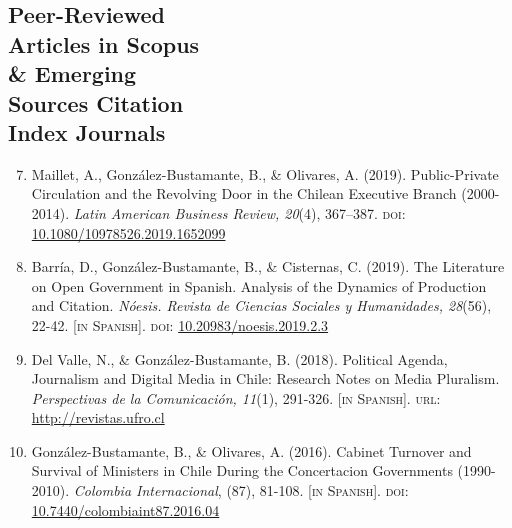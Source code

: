\documentclass[letterpaper,margin]{res}
\newenvironment{benumerate}[1]{
    \let\oldItem\item
    \def\item{\addtocounter{enumi}{-2}\oldItem}
    \begin{enumerate}
    \setcounter{enumi}{#1}
    \addtocounter{enumi}{1}
}{
    \end{enumerate}
}
\begin{document}
\begin{resume}

\section{\footnotesize Peer-Reviewed \\ Articles in Scopus \\ \& Emerging \\ Sources Citation \\ Index Journals}

\begin{benumerate}{6}
\item{\small Maillet, A., Gonz\'alez-Bustamante, B., \& Olivares, A. (2019). Public-Private Circulation and the Revolving Door in the Chilean Executive Branch (2000-2014). {\itshape Latin American Business Review, 20}(4), 367--387. {\scshape doi}: \href{https://doi.org/10.1080/10978526.2019.1652099}{10.1080/10978526.2019.1652099}}\vspace{1mm}

\item{\small Barr\'ia, D., Gonz\'alez-Bustamante, B., \& Cisternas, C. (2019). The Literature on Open Government in Spanish. Analysis of the Dynamics of Production and Citation. {\itshape N\'oesis. Revista de Ciencias Sociales y Humanidades, 28}(56), 22-42. {\footnotesize \scshape [in Spanish]}. {\scshape doi}: \href{http://dx.doi.org/10.20983/noesis.2019.2.3}{10.20983/noesis.2019.2.3}}\vspace{1mm}

\item{\small Del Valle, N., \& Gonz\'alez-Bustamante, B. (2018). Political Agenda, Journalism and Digital Media in Chile: Research Notes on Media Pluralism. {\itshape Perspectivas de la Comunicaci\'on, 11}(1), 291-326. {\footnotesize \scshape [in Spanish]}. {\scshape url}: \href{http://revistas.ufro.cl/ojs/index.php/perspectivas/article/view/1146}{http://revistas.ufro.cl}}\vspace{1mm}

\item{\small Gonz\'alez-Bustamante, B., \& Olivares, A. (2016). Cabinet Turnover and Survival of Ministers in Chile During the Concertacion Governments (1990-2010). {\itshape Colombia Internacional}, (87), 81-108. {\footnotesize \scshape [in Spanish]}. {\scshape doi}: \href{https://doi.org/10.7440/colombiaint87.2016.04}{10.7440/colombiaint87.2016.04}}\vspace{0.9mm}


\end{benumerate}
\end{resume}
\end{document}
